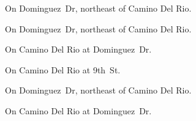 
\begin{LocationList}

On Dominguez~Dr, northeast of   Camino Del Rio.

\Location{\GasStation \Gas \Rest}
On Dominguez~Dr, northeast of   Camino Del Rio.

On   Camino Del Rio at Dominguez~Dr.

On  Camino Del Rio at 9th~St.

\Location{\TruckService \Service \Rest}
On Dominguez~Dr, northeast of   Camino Del Rio.

On   Camino Del Rio at Dominguez~Dr.

\end{LocationList}
